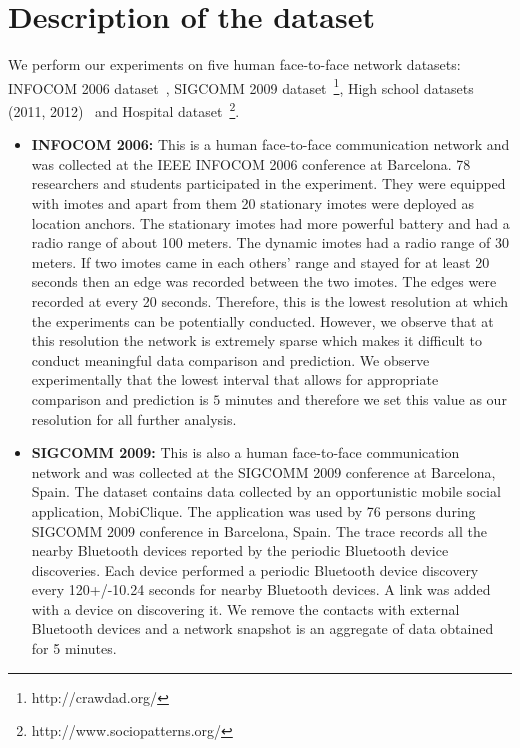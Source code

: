 \noindent
\section{Description of the dataset}
\label{dataset}
We perform our experiments on five human face-to-face network datasets: INFOCOM 2006 dataset~\cite{cambridge-haggle-imote-infocom2006-2009-05-29}, SIGCOMM 2009 dataset~\cite{thlab-sigcomm2009-mobiclique-proximity-2012-07-15}\footnote{http://crawdad.org/}, 
High school datasets (2011, 2012)~\cite{fournet2014contact} and Hospital dataset~\cite{vanhems2013estimating}\footnote{http://www.sociopatterns.org/}.


\begin{itemize}
\item {\bf INFOCOM 2006:}
This is a human face-to-face communication network and was collected at the IEEE INFOCOM 2006 conference at Barcelona.
78 researchers and students participated in the experiment. They were equipped with imotes and apart from them 20 stationary imotes were deployed as 
location anchors. The stationary imotes had more powerful battery and had a radio range of about 100 meters. The dynamic imotes had a radio range of 30 meters.
If two imotes came in each others' range and stayed for at least 20 seconds then an edge was recorded between the two imotes.
The edges were recorded at every 20 seconds. 
Therefore, this is the lowest resolution at which the experiments can be potentially conducted. However, we observe that at this resolution the network is extremely sparse 
which makes it difficult to conduct meaningful data comparison and prediction. We observe experimentally that the lowest interval that allows for appropriate comparison 
and prediction is $5$ minutes and therefore we set this value as our resolution for all further analysis.
 \item {\bf SIGCOMM 2009:}
 This is also a human face-to-face communication network and was collected at the SIGCOMM 2009 conference at Barcelona, Spain. The dataset contains data collected by an opportunistic mobile social 
application, MobiClique. The application was used by 76 persons during SIGCOMM 
2009 conference in Barcelona, Spain. The trace records all the nearby Bluetooth devices reported by the periodic 
Bluetooth device discoveries.
Each device performed a periodic Bluetooth device discovery every 120+/-10.24 seconds for nearby Bluetooth devices. A link was added with a device 
on discovering it. 
We remove the contacts with external Bluetooth 
devices and a network snapshot is an aggregate of data obtained for 5 minutes. 


\end{itemize}
